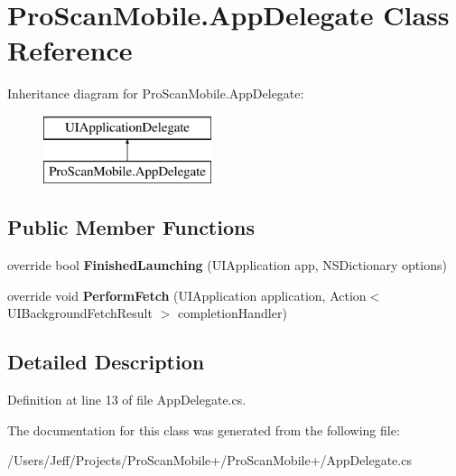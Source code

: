 \hypertarget{class_pro_scan_mobile_1_1_app_delegate}{\section{Pro\-Scan\-Mobile.\-App\-Delegate Class Reference}
\label{class_pro_scan_mobile_1_1_app_delegate}
}
Inheritance diagram for Pro\-Scan\-Mobile.\-App\-Delegate\-:\begin{figure}[H]
\begin{center}
\leavevmode
\includegraphics[height=2.000000cm]{class_pro_scan_mobile_1_1_app_delegate}
\end{center}
\end{figure}
\subsection*{Public Member Functions}
\begin{DoxyCompactItemize}
\item 
\hypertarget{class_pro_scan_mobile_1_1_app_delegate_a80c74e9bcf9109d07c26b0cd5bfd6894}{override bool {\bfseries Finished\-Launching} (U\-I\-Application app, N\-S\-Dictionary options)}\label{class_pro_scan_mobile_1_1_app_delegate_a80c74e9bcf9109d07c26b0cd5bfd6894}

\item 
\hypertarget{class_pro_scan_mobile_1_1_app_delegate_a9c4019ccd70667045aa01aed3ba052eb}{override void {\bfseries Perform\-Fetch} (U\-I\-Application application, Action$<$ U\-I\-Background\-Fetch\-Result $>$ completion\-Handler)}\label{class_pro_scan_mobile_1_1_app_delegate_a9c4019ccd70667045aa01aed3ba052eb}

\end{DoxyCompactItemize}


\subsection{Detailed Description}


Definition at line 13 of file App\-Delegate.\-cs.



The documentation for this class was generated from the following file\-:\begin{DoxyCompactItemize}
\item 
/\-Users/\-Jeff/\-Projects/\-Pro\-Scan\-Mobile+/\-Pro\-Scan\-Mobile+/App\-Delegate.\-cs\end{DoxyCompactItemize}
